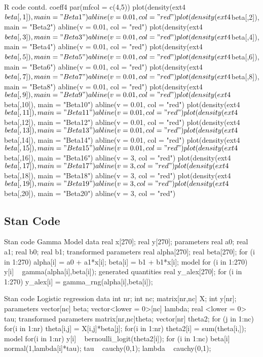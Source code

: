 \documentclass{article}
\begin{document}
\begin{sexylisting}{R code contd.}
coeff4
par(mfcol = c(4,5))
plot(density(ext4$beta[,1]), main = "Beta1")
abline(v = 0.01, col = "red")
plot(density(ext4$beta[,2]), main = "Beta2")
abline(v = 0.01, col = "red")
plot(density(ext4$beta[,3]), main = "Beta3")
abline(v = 0.01, col = "red")
plot(density(ext4$beta[,4]), main = "Beta4")
abline(v = 0.01, col = "red")
plot(density(ext4$beta[,5]), main = "Beta5")
abline(v = 0.01, col = "red")
plot(density(ext4$beta[,6]), main = "Beta6")
abline(v = 0.01, col = "red")
plot(density(ext4$beta[,7]), main = "Beta7")
abline(v = 0.01, col = "red")
plot(density(ext4$beta[,8]), main = "Beta8")
abline(v = 0.01, col = "red")
plot(density(ext4$beta[,9]), main = "Beta9")
abline(v = 0.01, col = "red")
plot(density(ext4$beta[,10]), main = "Beta10")
abline(v = 0.01, col = "red")
plot(density(ext4$beta[,11]), main = "Beta11")
abline(v = 0.01, col = "red")
plot(density(ext4$beta[,12]), main = "Beta12")
abline(v = 0.01, col = "red")
plot(density(ext4$beta[,13]), main = "Beta13")
abline(v = 0.01, col = "red")
plot(density(ext4$beta[,14]), main = "Beta14")
abline(v = 0.01, col = "red")
plot(density(ext4$beta[,15]), main = "Beta15")
abline(v = 0.01, col = "red")
plot(density(ext4$beta[,16]), main = "Beta16")
abline(v = 3, col = "red")
plot(density(ext4$beta[,17]), main = "Beta17")
abline(v = 3, col = "red")
plot(density(ext4$beta[,18]), main = "Beta18")
abline(v = 3, col = "red")
plot(density(ext4$beta[,19]), main = "Beta19")
abline(v = 3, col = "red")
plot(density(ext4$beta[,20]), main = "Beta20")
abline(v = 3, col = "red")
\end{sexylisting}

\subsection{Stan Code}
\begin{sexylisting}{Stan code Gamma Model}
data{
  real x[270];
  real y[270];
}
parameters{
  real a0;
  real a1;
  real b0;
  real b1;
}
transformed parameters{
  real alpha[270];
  real beta[270];
  for (i in 1:270){
  alpha[i] = a0 + a1*x[i];
  beta[i] = b1 + b1*x[i];
}
}
model{
  for (i in 1:270){
    y[i] ~ gamma(alpha[i],beta[i]);
  }
}
generated quantities{
  real y_alex[270];
  for (i in 1:270)
  y_alex[i] = gamma_rng(alpha[i],beta[i]);
}
\end{sexylisting}
\begin{sexylisting}{Stan code Logistic regression}
data{
  int nr;
  int nc;
  matrix[nr,nc] X;
  int y[nr];
}
parameters{
  vector[nc] beta;
  vector<lower = 0>[nc] lambda;
  real <lower = 0> tau;
}
transformed parameters{
  matrix[nr,nc]theta;
  vector[nr] theta2;
  for (j in 1:nc){
  for(i in 1:nr){
    theta[i,j] = X[i,j]*beta[j];
}
}
  for(i in 1:nr){
    theta2[i] = sum(theta[i,]);
  }
}
model{
  for(i in 1:nr){
    y[i] ~ bernoulli_logit(theta2[i]);
  }
  for (i in 1:nc){
  beta[i] ~ normal(1,lambda[i]*tau);
  }
  tau ~ cauchy(0,1);
  lambda ~ cauchy(0,1);
}
\end{sexylisting}
\end{document}
